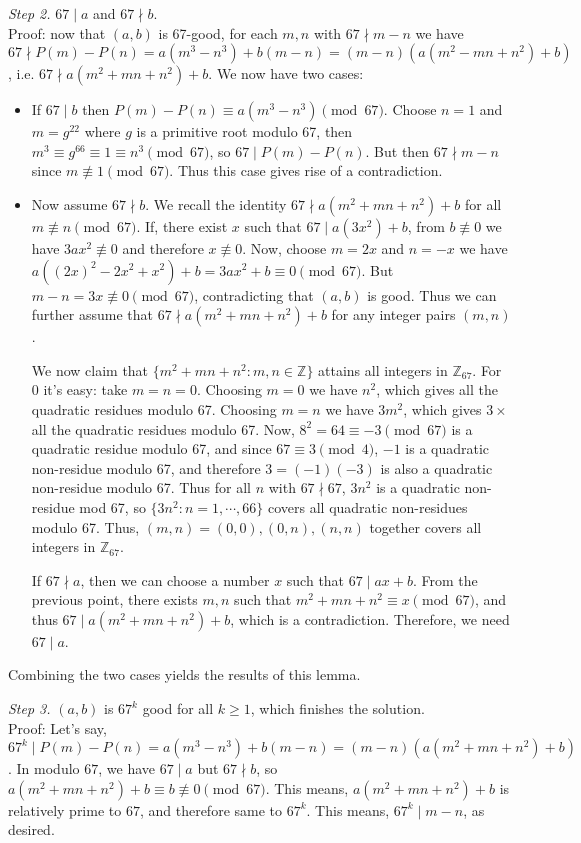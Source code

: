\documentclass[11pt]{article}
\newcommand{\bbZ}{\mathbb Z}
\newcommand{\<}{\langle}
\renewcommand{\>}{\rangle}
\begin{document}
\begin{enumerate}
	\emph{Step 2.} $67\mid a$ and $67\nmid b$. \\
	Proof: now that $(a, b)$ is 67-good, for each $m, n$ with $67\nmid m-n$ we have $67\nmid P(m)-P(n)=a(m^3-n^3)+b(m-n)=(m-n)(a(m^2-mn+n^2)+b)$, i.e. $67\nmid a(m^2+mn+n^2)+b$. We now have two cases: 
	\begin{itemize}
		\item If $67\mid b$ then $P(m)-P(n)\equiv a(m^3-n^3)\pmod{67}$. Choose $n=1$ and $m=g^{22}$ where $g$ is a primitive root modulo 67, then $m^3\equiv g^{66}\equiv 1\equiv n^3\pmod{67}$, so $67\mid P(m)-P(n)$. But then $67\nmid m-n$ since $m\not\equiv 1\pmod{67}$. Thus this case gives rise of a contradiction. 
		
		\item Now assume $67\nmid b$. We recall the identity $67\nmid a(m^2+mn+n^2)+b$ for all $m\not\equiv n\pmod{67}$. 
		If, there exist $x$ such that $67\mid a(3x^2)+b$, from $b\not\equiv 0$ we have $3ax^2\not\equiv 0$ and therefore $x\not\equiv 0$. 
		Now, choose $m=2x$ and $n=-x$ we have $a((2x)^2-2x^2+x^2)+b=3ax^2+b\equiv 0\pmod{67}$. 
		But $m-n=3x\not\equiv 0\pmod{67}$, contradicting that $(a, b)$ is good. 
		Thus we can further assume that $67\nmid a(m^2+mn+n^2)+b$ for any integer pairs $(m, n)$. 
		
		We now claim that $\{m^2+mn+n^2:m, n\in\bbZ\}$ attains all integers in $\bbZ_{67}$. For $0$ it's easy: take $m=n=0$. Choosing $m=0$ we have $n^2$, which gives all the quadratic residues modulo 67. Choosing $m=n$ we have $3m^2$, which gives $3\times$ all the quadratic residues modulo 67. 
		Now, $8^2=64\equiv-3\pmod{67}$ is a quadratic residue modulo 67, and since $67\equiv 3\pmod{4}$, $-1$ is a quadratic non-residue modulo 67, and therefore $3=(-1)(-3)$ is also a quadratic non-residue modulo 67. 
		Thus for all $n$ with $67\nmid 67$, $3n^2$ is a quadratic non-residue mod 67, so $\{3n^2: n=1, \cdots , 66\}$ covers all quadratic non-residues modulo 67. Thus, 
		$(m, n)=(0, 0), (0, n), (n, n)$ together covers all integers in $\bbZ_{67}$. 
		
		If $67\nmid a$, then we can choose a number $x$ such that $67\mid ax+b$. From the previous point, there exists $m, n$ such that $m^2+mn+n^2\equiv x\pmod{67}$, and thus $67\mid a(m^2+mn+n^2)+b$, which is a contradiction. 
		Therefore, we need $67\mid a$. 
	\end{itemize}
	
	Combining the two cases yields the results of this lemma. 
	
	\emph{Step 3.} $(a, b)$ is $67^k$ good for all $k\ge 1$, which finishes the solution. \\
	Proof: Let's say, $67^k\mid P(m)-P(n)=a(m^3-n^3)+b(m-n)=(m-n)(a(m^2+mn+n^2)+b)$. 
	In modulo $67$, we have $67\mid a$ but $67\nmid b$, so $a(m^2+mn+n^2)+b\equiv b\not\equiv 0\pmod{67}$. This means, $a(m^2+mn+n^2)+b$ is relatively prime to $67$, and therefore same to $67^k$. This means, $67^k\mid m-n$, as desired. 
	

\end{enumerate}
\end{document}
